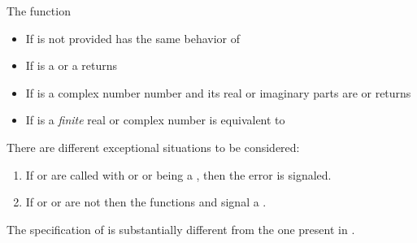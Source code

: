 \documentclass[../Comparisons-Predicates.tex]{subfiles}
\begin{document}
The function 
\begin{itemize}
\item If  is not provided has the same behavior of
\item If  is a  or a
   returns
   
\item If  is a complex number number and its real or
  imaginary parts are  or
   returns
   
\item If  is a \emph{finite} real or complex number is
  equivalent to  
  \code{)}
\end{itemize}

\DExceptional{}

There are different exceptional situations to be considered:
\begin{enumerate}
\item If  or  are called with
   or  or  being a
  , then the
   error is signaled.
\item If  or  or  are not \CL{}
   then the functions  and 
  signal a .
\end{enumerate}

% 


\DNotes{}

The specification of  is substantially different from the
one present in \cite{1994:ANSICL}.
\end{document}
